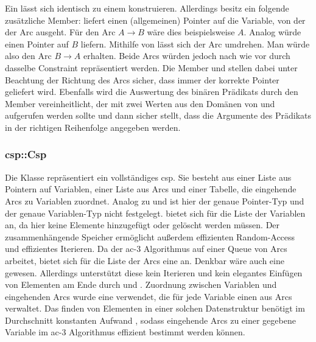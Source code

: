 Ein  lässt sich identisch zu einem  konstruieren. Allerdings besitz ein  folgende zusätzliche Member: 
liefert einen (allgemeinen) Pointer auf die Variable, von der der Arc ausgeht. Für den Arc $A \rightarrow B$ wäre dies beispielsweise $A$. Analog würde  einen
Pointer auf $B$ liefern. Mithilfe von  lässt sich der Arc umdrehen. Man würde also den Arc $B \rightarrow A$ erhalten. Beide Arcs würden jedoch nach wie vor
durch dasselbe Constraint repräsentiert werden. Die Member  und  stellen dabei unter Beachtung der Richtung des Arcs sicher, dass immer der korrekte
Pointer geliefert wird. Ebenfalls wird die Auswertung des binären Prädikats durch den Member  vereinheitlicht, der mit zwei Werten aus den Domänen
von  und  aufgerufen werden sollte und dann sicher stellt, dass die Argumente des Prädikats in der richtigen Reihenfolge angegeben werden.

\subsubsection{csp::Csp}
Die Klasse  repräsentiert ein vollständiges \ac*{csp}. Sie besteht aus einer Liste aus Pointern auf Variablen, einer Liste aus Arcs und einer Tabelle, die
eingehende Arcs zu Variablen zuordnet. Analog zu  und  ist hier der genaue Pointer-Typ und der genaue Variablen-Typ nicht festgelegt.
 bietet sich für die Liste der Variablen an, da hier keine Elemente hinzugefügt oder gelöscht werden müssen. Der zusammenhängende Speicher ermöglicht außerdem
effizienten Random-Access und effizientes Iterieren. Da der \ac*{ac}-3 Algorithmus auf einer Queue von Arcs arbeitet, bietet sich für die Liste der Arcs eine 
an. Denkbar wäre auch eine  gewesen. Allerdings unterstützt diese kein Iterieren und kein elegantes Einfügen von Elementen am Ende durch
 und . Zuordnung zwischen Variablen und eingehenden Arcs wurde eine  verwendet, die für jede Variable
einen  aus Arcs verwaltet. Das finden von Elementen in einer solchen Datenstruktur benötigt im Durchschnitt konstanten Aufwand \cite{uMap}, sodass eingehende
Arcs zu einer gegebene Variable im \ac*{ac}-3 Algorithmus effizient bestimmt werden können.

